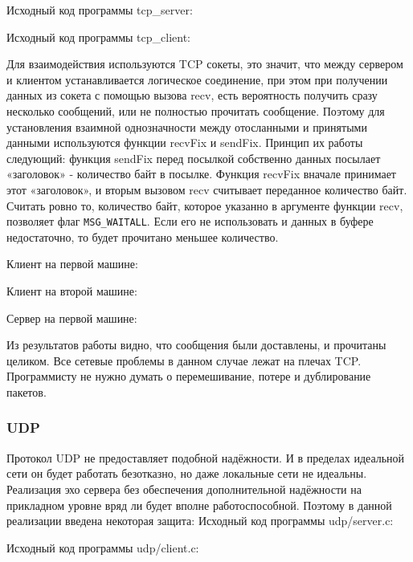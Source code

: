 \documentclass[a4paper]{article}
\begin{document}
	Исходный код программы tcp\_server:
	
		
	Исходный код программы tcp\_client:
	
	
	Для взаимодействия используются TCP сокеты, это значит, что между сервером и клиентом устанавливается логическое соединение, при этом при получении данных из сокета с помощью вызова recv, есть вероятность получить сразу несколько сообщений, или не полностью прочитать сообщение. Поэтому для установления взаимной однозначности между отосланными и принятыми данными используются функции recvFix и sendFix. Принцип их работы следующий: функция sendFix перед посылкой собственно данных посылает «заголовок» - количество байт в посылке. Функция recvFix вначале принимает этот «заголовок», и вторым вызовом recv считывает переданное количество байт. Считать ровно то, количество байт, которое указанно в аргументе функции recv, позволяет флаг \texttt{MSG\_WAITALL}. Если его не использовать и данных в буфере недостаточно, то будет прочитано меньшее количество.
	
	Клиент на первой машине:
	
	
	Клиент на второй машине:
	
	
	Сервер на первой машине:
	
	
	Из результатов работы видно, что сообщения были доставлены, и прочитаны целиком. Все сетевые проблемы в данном случае лежат на плечах TCP. Программисту не нужно думать о перемешивание, потере и дублирование пакетов.\\
	
	\subsubsection{UDP}	
	Протокол UDP не предоставляет подобной надёжности. И в пределах идеальной сети он будет работать безотказно, но даже локальные сети не идеальны. Реализация эхо сервера без обеспечения дополнительной надёжности на прикладном уровне вряд ли будет вполне работоспособной. Поэтому в данной реализации введена некоторая защита:
	Исходный код программы udp/server.c:
	
		
	Исходный код программы udp/client.c:
	
	
\end{document}
